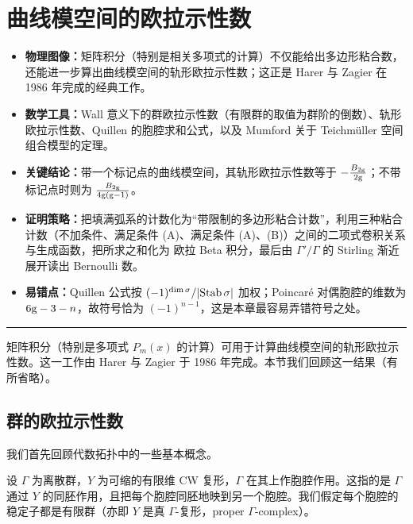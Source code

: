 \section{曲线模空间的欧拉示性数}

\begin{keytakeaways}
\begin{itemize}
  \item \textbf{物理图像：}矩阵积分（特别是相关多项式的计算）不仅能给出多边形粘合数，还能进一步算出曲线模空间的轨形欧拉示性数；这正是 Harer 与 Zagier 在 1986 年完成的经典工作。
  \item \textbf{数学工具：}Wall 意义下的群欧拉示性数（有限群的取值为群阶的倒数）、轨形欧拉示性数、Quillen 的胞腔求和公式，以及 Mumford 关于 Teichmüller 空间组合模型的定理。
  \item \textbf{关键结论：}带一个标记点的曲线模空间，其轨形欧拉示性数等于 $-\frac{B_{2{\rm g}}}{2{\rm g}}$；不带标记点时则为 $\frac{B_{2{\rm g}}}{4{\rm g}({\rm g}-1)}$。
  \item \textbf{证明策略：}把填满弧系的计数化为“带限制的多边形粘合计数”，利用三种粘合计数（不加条件、满足条件 (A)、满足条件 (A)、(B)）之间的二项式卷积关系与生成函数，把所求之和化为 欧拉 Beta 积分，最后由 $\Gamma'/\Gamma$ 的 Stirling 渐近展开读出 Bernoulli 数。
  \item \textbf{易错点：}Quillen 公式按 $(-1)^{\dim\sigma}/|{\rm Stab}\,\sigma|$ 加权；Poincaré 对偶胞腔的维数为 $6{\rm g}-3-n$，故符号恰为 $(-1)^{n-1}$，这是本章最容易弄错符号之处。
\end{itemize}
\end{keytakeaways}

\bigskip
\noindent\rule{\textwidth}{0.6pt}
\bigskip

矩阵积分（特别是多项式 $P_m(x)$ 的计算）可用于计算曲线模空间的轨形欧拉示性数。这一工作由 Harer 与 Zagier 于 1986 年完成。本节我们回顾这一结果（有所省略）。

\subsection{群的欧拉示性数}

我们首先回顾代数拓扑中的一些基本概念。

设 $\Gamma$ 为离散群，$Y$ 为可缩的有限维 CW 复形，$\Gamma$ 在其上作胞腔作用。这指的是 $\Gamma$ 通过 $Y$ 的同胚作用，且把每个胞腔同胚地映到另一个胞腔。我们假定每个胞腔的稳定子都是有限群（亦即 $Y$ 是真 $\Gamma$-复形，proper $\Gamma$-complex）。


